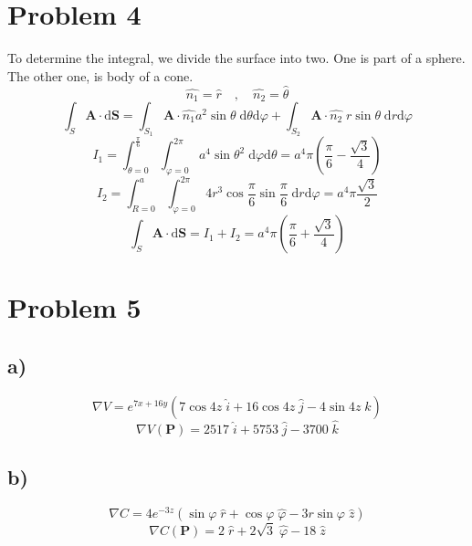 \documentclass[12pt]{article}
\begin{document}
	\section{Problem 4}
	To determine the integral, we divide the surface into two. One is part of a sphere. The other one, is body of a cone.
	\begin{equation}
		\hat{n_1} = \hat{r} \quad , \quad \hat{n_2} = \hat{\theta}
	\end{equation}
	\begin{equation}
		\int_S \textbf{A} \cdot \text{d}\textbf{S} = \int_{S_1} \textbf{A} \cdot \hat{n_1} a^2 \sin{\theta} \; \text{d}\theta \text{d}\varphi + \int_{S_2} \textbf{A} \cdot \hat{n_2} \; r \sin{\theta} \; \text{d}r \text{d}\varphi
	\end{equation}
	\begin{equation}
		I_1 = \int_{\theta = 0}^{\frac\pi6} \int_{\varphi = 0}^{2\pi} a^4 \sin{\theta}^2 \; \text{d}\varphi \text{d}\theta = a^4\pi \left(\frac{\pi}{6} - \frac{\sqrt{3}}{4}\right)
	\end{equation}
	\begin{equation}
		I_2 = \int_{R = 0}^{a} \int_{\varphi = 0}^{2\pi} 4 r^3 \cos{\frac\pi6} \sin{\frac\pi6} \; \text{d}r \text{d}\varphi  = a^4 \pi \frac{\sqrt{3}}{2} 
	\end{equation}
	\begin{equation}
		\int_S \textbf{A} \cdot \text{d}\textbf{S} = I_1 + I_2 = a^4\pi \left(\frac{\pi}{6} + \frac{\sqrt{3}}{4}\right)
	\end{equation}
	\section{Problem 5}
	\subsection{a)}
	\begin{equation}
		\nabla V = e^{7x + 16y}\left(7 \cos{4z} \; \hat{i} + 16 \cos{4z} \; \hat{j} - 4 \sin{4z} \; \hat{k} \right)
	\end{equation}
	\begin{equation}
		\nabla V (\textbf{P}) = 2517\; \hat{i} + 5753 \; \hat{j} -3700 \; \hat{k} 
	\end{equation}
	\subsection{b)}
	\begin{equation}
		\nabla C = 4 e^{-3z} \left( \sin{\varphi} \; \hat{r} + \cos{\varphi} \; \hat{\varphi} - 3r \sin{\varphi}  \; \hat{z} \right)
	\end{equation}
	\begin{equation}
		\nabla C(\textbf{P}) = 2 \; \hat{r} + 2 \sqrt{3} \; \hat{\varphi} - 18  \; \hat{z}
	\end{equation}
\end{document}
